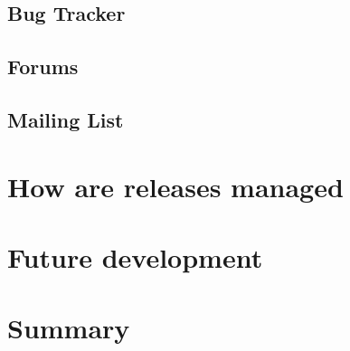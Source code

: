 \documentclass{article}
\begin{document}

\subsection{Bug Tracker} %
\label{sub:bug_tracker}


\subsection{Forums} %
\label{sub:forums}


\subsection{Mailing List} %
\label{sub:mailing_list}



\section{How are releases managed} %
\label{sec:how_are_releases_managed}


\section{Future development} %
\label{sec:future_development}


\section{Summary} %
\label{sec:summary}

\end{document}
